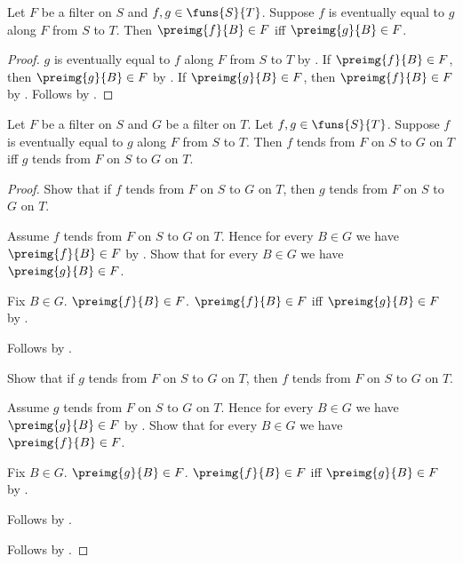 \begin{theorem}\label{filter_eventually_equal_preimage_iff}
    Let $F$ be a filter on $S$ and $f,g\in\funs{S}{T}$.
    Suppose $f$ is eventually equal to $g$ along $F$ from $S$ to $T$.
    Then $\preimg{f}{B}\in F$ iff $\preimg{g}{B}\in F$.
\end{theorem}
\begin{proof}
    $g$ is eventually equal to $f$ along $F$ from $S$ to $T$ by
        .
    If $\preimg{f}{B}\in F$, then $\preimg{g}{B}\in F$ by
        .
    If $\preimg{g}{B}\in F$, then $\preimg{f}{B}\in F$ by
        .
    Follows by \auto.
\end{proof}

\begin{theorem}\label{filter_tendsto_congruent}
    Let $F$ be a filter on $S$ and $G$ be a filter on $T$.
    Let $f,g\in\funs{S}{T}$.
    Suppose $f$ is eventually equal to $g$ along $F$ from $S$ to $T$.
    Then $f$ tends from $F$ on $S$ to $G$ on $T$ iff
        $g$ tends from $F$ on $S$ to $G$ on $T$.
\end{theorem}
\begin{proof}
    Show that if $f$ tends from $F$ on $S$ to $G$ on $T$, then
        $g$ tends from $F$ on $S$ to $G$ on $T$.
    \begin{subproof}
        Assume $f$ tends from $F$ on $S$ to $G$ on $T$.
        Hence for every $B\in G$ we have $\preimg{f}{B}\in F$ by
            .
        Show that for every $B\in G$ we have $\preimg{g}{B}\in F$.
        \begin{subproof}
            Fix $B\in G$.
            $\preimg{f}{B}\in F$.
            $\preimg{f}{B}\in F$ iff $\preimg{g}{B}\in F$ by
                .
        \end{subproof}
        Follows by .
    \end{subproof}
    Show that if $g$ tends from $F$ on $S$ to $G$ on $T$, then
        $f$ tends from $F$ on $S$ to $G$ on $T$.
    \begin{subproof}
        Assume $g$ tends from $F$ on $S$ to $G$ on $T$.
        Hence for every $B\in G$ we have $\preimg{g}{B}\in F$ by
            .
        Show that for every $B\in G$ we have $\preimg{f}{B}\in F$.
        \begin{subproof}
            Fix $B\in G$.
            $\preimg{g}{B}\in F$.
            $\preimg{f}{B}\in F$ iff $\preimg{g}{B}\in F$ by
                .
        \end{subproof}
        Follows by .
    \end{subproof}
    Follows by \auto.
\end{proof}

